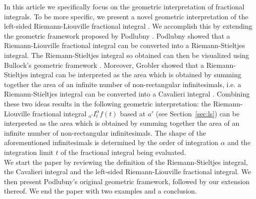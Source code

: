 \documentclass[twoside,reqno,11pt]{fcaa-var} %
\begin{document}
\noindent
In this article we specifically focus on the geometric interpretation of fractional integrals. To be more specific, we present a novel geometric interpretation of the left-sided Riemann-Liouville fractional integral \cite{laurent1884}. We accomplish this by extending the geometric framework proposed by Podlubny \cite{podlubny02}.
Podlubny showed that a Riemann-Liouville fractional integral can be converted into a Riemann-Stieltjes integral. The Riemann-Stieltjes integral so obtained can then be visualized using Bullock's geometric framework \cite{bullock88}. Moreover, Grobler showed that a Riemann-Stieltjes integral can be interpreted as the area which is obtained by summing together the area of an infinite number of non-rectangular infinitesimals, i.e. a Riemann-Stieltjes integral can be converted into a Cavalieri integral \cite{ackermann12,grobler19}. Combining these two ideas results in the following geometric interpretation: the Riemann-Liouville fractional integral $_{a'}I_t^{\alpha} f(t)$  based at $a'$ (see Section~\ref{sec:ls}) can be interpreted as the area which is obtained by summing together the area of an infinite number of non-rectangular infinitesimals. The shape
of the aforementioned infinitesimals is determined by the order of integration $\alpha$ and the integration limit $t$ of the fractional integral being evaluated.\\

\noindent
We start the paper by reviewing the definition of the Riemann-Stieltjes integral, the Cavalieri integral and the left-sided Riemann-Liouville fractional integral. We then present Podlubny's original geometric framework, followed by our extension thereof. We end the paper with two examples and a conclusion.
\end{document}
